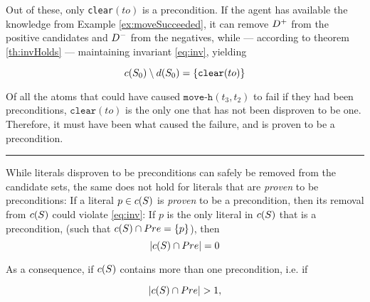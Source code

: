 \documentclass[\master/Master.tex]{subfiles}
\begin{document}
\begin{example}
    Out of these, only \texttt{clear}$(to)$ is a precondition. If the agent has available the knowledge from Example \ref{ex:moveSucceeded}, it can remove $D^+$ from the positive candidates and $D^-$ from the negatives, while --- according to theorem \ref{th:invHolds} --- maintaining invariant \eqref{eq:inv}, yielding

    \begin{equation}
        c(S_0) \setminus d(S_0) = \left\{ \texttt{clear}(to) \right\}
    \end{equation}


    Of all the atoms that could have caused $\texttt{move-h}(t_3, t_2)$ to fail if they had been preconditions, $\texttt{clear}(to)$ is the only one that has not been disproven to be one. Therefore, it must have been what caused the failure, and is proven to be a precondition.

    \noindent\rule{\textwidth}{1pt}
\end{example}

While literals disproven to be preconditions can safely be removed from the candidate sets, the same does not hold for literals that are \emph{proven} to be preconditions:
If a literal $p \in c(S)$ is \textit{proven} to be a precondition, then its removal from $c(S)$ could violate \eqref{eq:inv}: 
If $p$ is the only literal in $c(S)$ that is a precondition, (such that $c(S) \cap Pre = \{ p \}$), then
\begin{equation*}
    \left| c(S) \cap Pre \right| = 0
\end{equation*}

As a consequence, if $c(S)$ contains more than one precondition, i.e. if

\begin{equation*}
    \left| c(S) \cap Pre \right| > 1,
\end{equation*}
\end{document}
